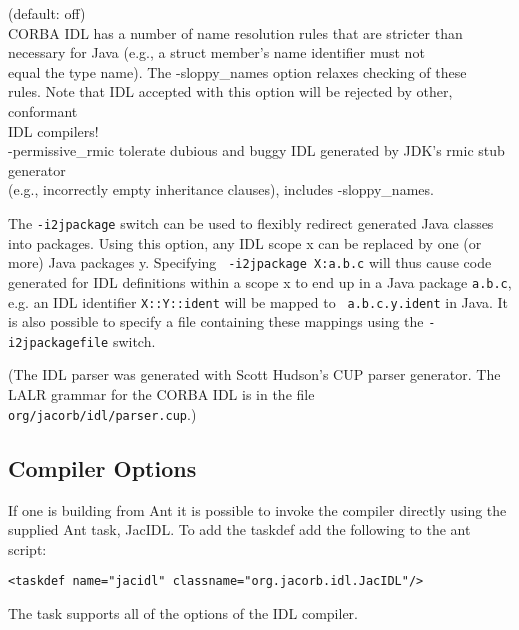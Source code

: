 \begin{tabbing}
(default: off)\\
\> \> CORBA IDL has a number of  name resolution rules that are
stricter than\\
\> \> necessary for Java (e.g., a struct member's name identifier must
not \\
\> \> equal the type name). The -sloppy\_names option relaxes checking of
these \\
\> \>  rules. Note that IDL accepted with this option will be rejected
by other, conformant  \\
\> \> IDL compilers!\\
\> -permissive\_rmic  \>  tolerate dubious and buggy IDL generated by
JDK's rmic stub generator\\
\> \> (e.g., incorrectly empty inheritance clauses), includes -sloppy\_names.\\
\end{tabbing}

The {\tt -i2jpackage} switch can be used to flexibly redirect
generated Java classes into packages. Using this option, any IDL scope
x can be replaced by one (or more) Java packages y. Specifying {\tt
  -i2jpackage X:a.b.c} will thus cause code generated for IDL
definitions within a scope x to end up in a Java package {\tt a.b.c},
e.g. an IDL identifier {\tt X::Y::ident} will be mapped to {\tt
  a.b.c.y.ident} in Java. It is also possible to specify a file
containing these mappings using the {\tt -i2jpackagefile} switch.

(The  IDL  parser  was   generated  with  Scott  Hudson's  CUP  parser
generator.  The  LALR grammar for  the CORBA IDL  is in the  file {\tt
org/jacorb/idl/parser.cup}.)

\subsection*{Compiler Options}
If one is building from Ant it is possible to invoke the compiler directly
using the supplied Ant task, JacIDL. To add the taskdef add the following
to the ant script:
\small{
\begin{verbatim}
<taskdef name="jacidl" classname="org.jacorb.idl.JacIDL"/>
\end{verbatim}
}
The task supports all of the options of the IDL compiler.


